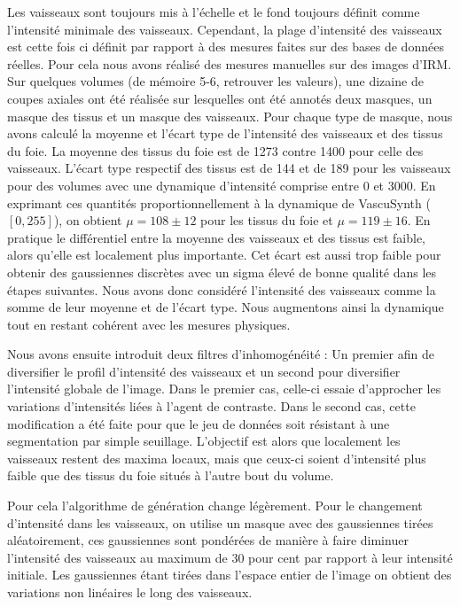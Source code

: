Les vaisseaux sont toujours mis à l'échelle et le fond toujours définit comme l'intensité minimale des vaisseaux. Cependant, la plage d'intensité des vaisseaux est cette fois ci définit par rapport à des mesures faites sur des bases de données réelles. Pour cela nous avons réalisé des mesures manuelles sur des images d'IRM. Sur quelques volumes (de mémoire 5-6, retrouver les valeurs), une dizaine de coupes axiales ont été réalisée sur lesquelles ont été annotés deux masques, un masque des tissus et un masque des vaisseaux. Pour chaque type de masque, nous avons calculé la moyenne et l'écart type de l'intensité des vaisseaux et des tissus du foie. La moyenne des tissus du foie est de 1273 contre 1400 pour celle des vaisseaux. L'écart type respectif des tissus est de 144 et de 189 pour les vaisseaux pour des volumes avec une dynamique d'intensité comprise entre 0 et 3000. En exprimant ces quantités proportionnellement à la dynamique de VascuSynth ($[0,255]$), on obtient $\mu=108 \pm 12$ pour les tissus du foie et $\mu=119 \pm 16$. En pratique le différentiel entre la moyenne des vaisseaux et des tissus est faible, alors qu'elle est localement plus importante. Cet écart est aussi trop faible pour obtenir des gaussiennes discrètes avec un sigma élevé de bonne qualité dans les étapes suivantes. Nous avons donc considéré l'intensité des vaisseaux comme la somme de leur moyenne et de l'écart type. Nous augmentons ainsi la dynamique tout en restant cohérent avec les mesures physiques.

Nous avons ensuite introduit deux filtres d'inhomogénéité : Un premier afin de diversifier le profil d'intensité des vaisseaux et un second pour diversifier l'intensité globale de l'image. Dans le premier cas, celle-ci essaie d'approcher les variations d'intensités liées à l'agent de contraste. Dans le second cas, cette modification a été faite pour que le jeu de données soit résistant à une segmentation par simple seuillage. L'objectif est alors que localement les vaisseaux restent des maxima locaux, mais que ceux-ci soient d'intensité plus faible que des tissus du foie situés à l'autre bout du volume.

Pour cela l'algorithme de génération change légèrement. Pour le changement d'intensité dans les vaisseaux, on utilise un masque avec des gaussiennes tirées aléatoirement, ces gaussiennes sont pondérées de manière à faire diminuer l'intensité des vaisseaux au maximum de $30$ pour cent par rapport à leur intensité initiale. Les gaussiennes étant tirées dans l'espace entier de l'image on obtient des variations non linéaires le long des vaisseaux.

